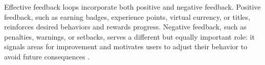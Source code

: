 Effective feedback loops incorporate both positive and negative feedback.
Positive feedback, such as earning badges, experience points, virtual currency, or titles, reinforces desired behaviors and rewards progress. Negative feedback, such as penalties, warnings, or setbacks, serves a different but equally important role: it signals areas for improvement and motivates users to adjust their behavior to avoid future consequences \cite{feedbackLoop2}.
